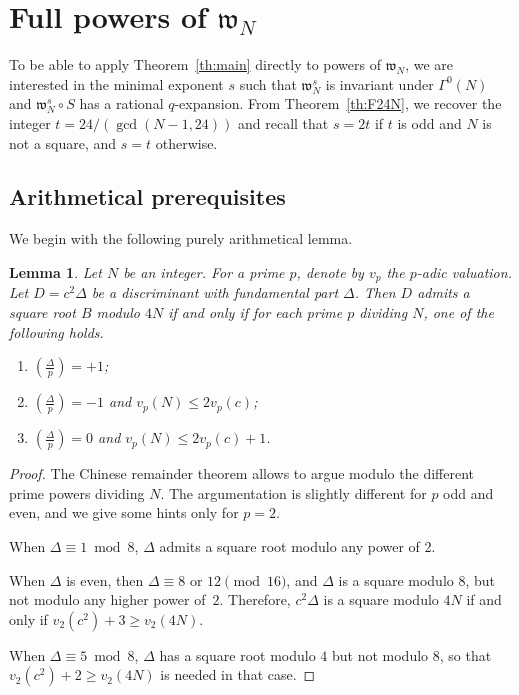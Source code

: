 \documentclass[12pt,twoside,leqno]{article}
\newtheorem{lemma}[theorem]{Lemma}
\numberwithin{equation}{section}
\renewcommand{\geq}{\geqslant}
\renewcommand{\leq}{\leqslant}
\newcommand{\legendre}[2]{\genfrac {(}{)}{1pt}{}{#1}{#2}}
\newcommand{\w}{\mathfrak w}
\begin{document}
\section{Full powers of \texorpdfstring {$\w_N$}{wN}}
\label{sct:fullpowers}

To be able to apply Theorem~\ref {th:main} directly to powers of
$\w_N$, we are interested in the minimal exponent $s$ such that $\w_N^s$
is invariant under $\Gamma^0 (N)$ and $\w_N^s \circ S$ has a rational
$q$-expansion. From Theorem~\ref {th:F24N}, we recover the integer $t
= 24/(\gcd (N - 1, 24))$ and recall that
$s = 2t$ if $t$ is odd and $N$ is not a square, and $s = t$
otherwise.

\subsection{Arithmetical prerequisites}

We begin with the following purely arithmetical lemma.
\begin{lemma}\label{lemma:eq2}
Let $N$ be an integer. For a prime $p$, denote
by $v_p$ the $p$-adic valuation.
Let $D = c^2 \Delta$ be a discriminant with fundamental part
$\Delta$. Then $D$ admits a square root $B$ modulo $4 N$
if and only if for each prime $p$ dividing $N$, one
of the following holds.
\begin{enumerate}
\item $\legendre{\Delta}{p}=+1$;
\item $\legendre{\Delta}{p}=-1$ and $v_p(N)\leq 2 v_p(c)$;
\item $\legendre{\Delta}{p}=0$  and $v_p(N) \leq 2 v_p(c)+1$.
\end{enumerate}
\end{lemma}

\begin{proof}
The Chinese remainder theorem allows to argue modulo the
different prime powers dividing $N$. The argumentation is
slightly different for $p$ odd and even, and we give some hints
only for $p=2$.

When $\Delta\equiv 1\bmod 8$, $\Delta$ admits a square root modulo any
power of 2.

When $\Delta$ is even, then $\Delta \equiv 8$ or $12 \pmod {16}$,
and $\Delta$ is a square modulo $8$, but not modulo any higher power
of~$2$. Therefore, $c^2 \Delta$ is a square modulo $4N$ if and only if
$v_2(c^2) + 3 \geq v_2(4N)$.

When $\Delta\equiv 5\bmod 8$, $\Delta$ has a square root modulo
$4$ but not modulo $8$, so that $v_2(c^2) + 2 \geq v_2(4N)$ is needed in
that case.
\end{proof}
\end{document}
